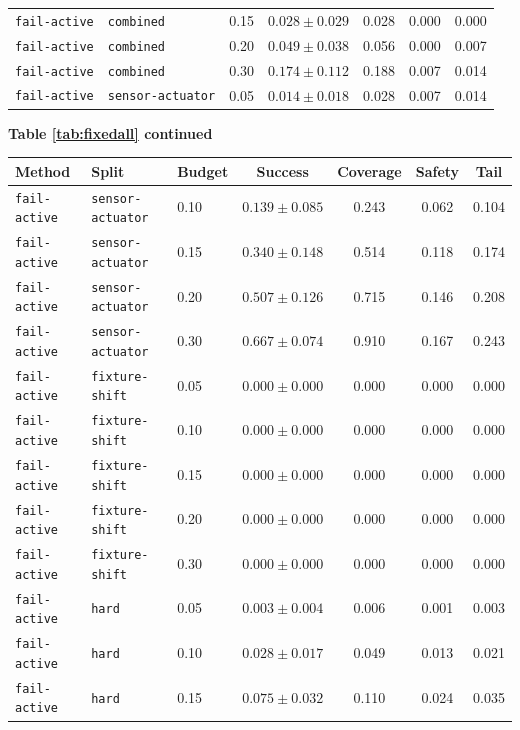\documentclass{article}
\begin{document}
\begin{center}
\begin{tabular}{lllcccc}
\texttt{fail-active} & \texttt{combined} & 0.15 & $0.028 \pm 0.029$ & 0.028 & 0.000 & 0.000 \\
\texttt{fail-active} & \texttt{combined} & 0.20 & $0.049 \pm 0.038$ & 0.056 & 0.000 & 0.007 \\
\texttt{fail-active} & \texttt{combined} & 0.30 & $0.174 \pm 0.112$ & 0.188 & 0.007 & 0.014 \\
\texttt{fail-active} & \texttt{sensor-actuator} & 0.05 & $0.014 \pm 0.018$ & 0.028 & 0.007 & 0.014 \\
\bottomrule
\end{tabular}
\end{center}
\begin{center}
\textbf{Table \ref{tab:fixedall} continued}\\[0.4ex]
\begin{tabular}{lllcccc}
\toprule
Method & Split & Budget & Success & Coverage & Safety & Tail \\
\midrule
\texttt{fail-active} & \texttt{sensor-actuator} & 0.10 & $0.139 \pm 0.085$ & 0.243 & 0.062 & 0.104 \\
\texttt{fail-active} & \texttt{sensor-actuator} & 0.15 & $0.340 \pm 0.148$ & 0.514 & 0.118 & 0.174 \\
\texttt{fail-active} & \texttt{sensor-actuator} & 0.20 & $0.507 \pm 0.126$ & 0.715 & 0.146 & 0.208 \\
\texttt{fail-active} & \texttt{sensor-actuator} & 0.30 & $0.667 \pm 0.074$ & 0.910 & 0.167 & 0.243 \\
\texttt{fail-active} & \texttt{fixture-shift} & 0.05 & $0.000 \pm 0.000$ & 0.000 & 0.000 & 0.000 \\
\texttt{fail-active} & \texttt{fixture-shift} & 0.10 & $0.000 \pm 0.000$ & 0.000 & 0.000 & 0.000 \\
\texttt{fail-active} & \texttt{fixture-shift} & 0.15 & $0.000 \pm 0.000$ & 0.000 & 0.000 & 0.000 \\
\texttt{fail-active} & \texttt{fixture-shift} & 0.20 & $0.000 \pm 0.000$ & 0.000 & 0.000 & 0.000 \\
\texttt{fail-active} & \texttt{fixture-shift} & 0.30 & $0.000 \pm 0.000$ & 0.000 & 0.000 & 0.000 \\
\texttt{fail-active} & \texttt{hard} & 0.05 & $0.003 \pm 0.004$ & 0.006 & 0.001 & 0.003 \\
\texttt{fail-active} & \texttt{hard} & 0.10 & $0.028 \pm 0.017$ & 0.049 & 0.013 & 0.021 \\
\texttt{fail-active} & \texttt{hard} & 0.15 & $0.075 \pm 0.032$ & 0.110 & 0.024 & 0.035 \\

\end{tabular}
\end{center}
\end{document}
